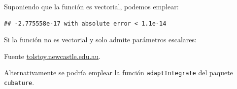 \documentclass[]{book}
\newenvironment{Shaded}{\begin{snugshade}}{\end{snugshade}}
\newcommand{\KeywordTok}[1]{\textcolor[rgb]{0.13,0.29,0.53}{\textbf{#1}}}
\newcommand{\ControlFlowTok}[1]{\textcolor[rgb]{0.13,0.29,0.53}{\textbf{#1}}}
\newcommand{\OperatorTok}[1]{\textcolor[rgb]{0.81,0.36,0.00}{\textbf{#1}}}
\newcommand{\NormalTok}[1]{#1}
\theoremstyle{definition}
\theoremstyle{definition}
\theoremstyle{definition}
\theoremstyle{remark}
\begin{document}
Suponiendo que la función es vectorial, podemos emplear:

\begin{Shaded}
\end{Shaded}

\begin{verbatim}
## -2.775558e-17 with absolute error < 1.1e-14
\end{verbatim}

Si la función no es vectorial y solo admite parámetros escalares:

\begin{Shaded}
\end{Shaded}

Fuente
\href{http://tolstoy.newcastle.edu.au/R/help/04/10/5951.html}{tolstoy.newcastle.edu.au}.

Alternativamente se podría emplear la función \texttt{adaptIntegrate}
del paquete \texttt{cubature}.


\end{document}
